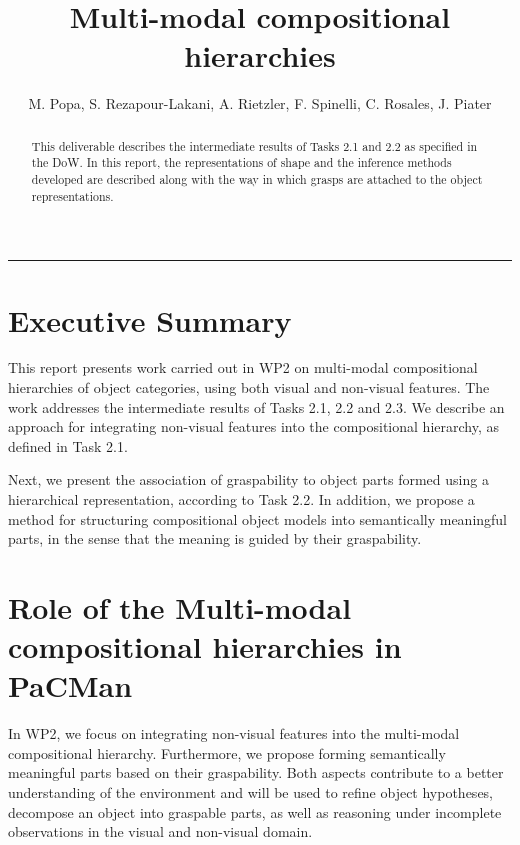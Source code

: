 \documentclass[a4paper,11pt,pdf]{pacmanreport}
\title{Multi-modal compositional hierarchies}
\author{M. Popa, S. Rezapour-Lakani, A. Rietzler, F. Spinelli, C. Rosales, J. Piater}
\begin{document}
\maketitle

\begin{abstract}
\noindent This deliverable describes the intermediate results of Tasks 2.1 and 2.2 as specified in the DoW. In this report, the representations of shape and the inference methods developed are described along with the way in which grasps are attached to the object representations.
\end{abstract}

\vspace{.2em}
\hrule

\footnotesize

\tableofcontents

\normalsize

\newpage

\section*{Executive Summary}

This report presents work carried out in WP2 on multi-modal compositional hierarchies of object categories, using both visual and non-visual features. The work addresses the intermediate results of Tasks 2.1, 2.2 and 2.3. We describe an approach for integrating non-visual features into the compositional hierarchy, as defined in Task 2.1.

Next, we present the association of graspability to object parts formed using a hierarchical representation, according to Task 2.2. In addition, we propose a method for structuring compositional object models into semantically meaningful parts, in the sense that the meaning is guided by their graspability.

\section*{Role of the Multi-modal compositional hierarchies in PaCMan}

In WP2, we focus on integrating non-visual features into the multi-modal compositional hierarchy. Furthermore, we propose forming semantically meaningful parts based on their graspability. Both aspects contribute to a better understanding of the environment and  will be used to refine object hypotheses, decompose an object into graspable parts, as well as reasoning under incomplete observations in the visual and non-visual domain.
\end{document}
